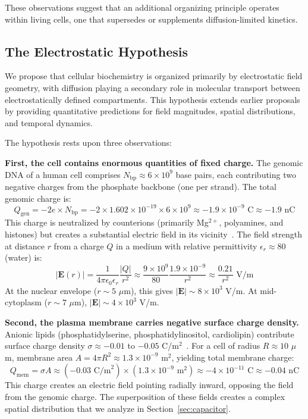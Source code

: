 \documentclass[twocolumn,10pt,aps,prd,superscriptaddress,floatfix,nofootinbib]{revtex4-2}
\theoremstyle{remark}
\begin{document}
These observations suggest that an additional organizing principle operates within living cells, one that supersedes or supplements diffusion-limited kinetics.

\subsection{The Electrostatic Hypothesis}

We propose that cellular biochemistry is organized primarily by electrostatic field geometry, with diffusion playing a secondary role in molecular transport between electrostatically defined compartments. This hypothesis extends earlier proposals~\cite{Pollack2001,Ling2001} by providing quantitative predictions for field magnitudes, spatial distributions, and temporal dynamics.

The hypothesis rests upon three observations:

\textbf{First, the cell contains enormous quantities of fixed charge.} The genomic DNA of a human cell comprises $N_{\mathrm{bp}} \approx 6 \times 10^{9}$ base pairs, each contributing two negative charges from the phosphate backbone (one per strand). The total genomic charge is:
\begin{equation}
Q_{\mathrm{gen}} = -2e \times N_{\mathrm{bp}} = -2 \times 1.602 \times 10^{-19} \times 6 \times 10^{9} \approx -1.9 \times 10^{-9} \text{ C} \approx -1.9 \text{ nC}
\label{eq:genomic_charge}
\end{equation}
This charge is neutralized by counterions (primarily Mg$^{2+}$, polyamines, and histones) but creates a substantial electric field in its vicinity~\cite{Manning1978}. The field strength at distance $r$ from a charge $Q$ in a medium with relative permittivity $\epsilon_r \approx 80$ (water) is:
\begin{equation}
|\mathbf{E}(r)| = \frac{1}{4\pi\epsilon_0\epsilon_r} \frac{|Q|}{r^2} \approx \frac{9 \times 10^{9}}{80} \frac{1.9 \times 10^{-9}}{r^2} \approx \frac{0.21}{r^2} \text{ V/m}
\label{eq:field_from_genome}
\end{equation}
At the nuclear envelope ($r \sim 5$ $\mu$m), this gives $|\mathbf{E}| \sim 8 \times 10^{3}$ V/m. At mid-cytoplasm ($r \sim 7$ $\mu$m), $|\mathbf{E}| \sim 4 \times 10^{3}$ V/m.

\textbf{Second, the plasma membrane carries negative surface charge density.} Anionic lipids (phosphatidylserine, phosphatidylinositol, cardiolipin) contribute surface charge density $\sigma \approx -0.01$ to $-0.05$ C/m$^2$~\cite{McLaughlin1989,Israelachvili2011}. For a cell of radius $R \approx 10$ $\mu$m, membrane area $A = 4\pi R^2 \approx 1.3 \times 10^{-9}$ m$^2$, yielding total membrane charge:
\begin{equation}
Q_{\mathrm{mem}} = \sigma A \approx (-0.03 \text{ C/m}^2) \times (1.3 \times 10^{-9} \text{ m}^2) \approx -4 \times 10^{-11} \text{ C} \approx -0.04 \text{ nC}
\label{eq:membrane_charge}
\end{equation}
This charge creates an electric field pointing radially inward, opposing the field from the genomic charge. The superposition of these fields creates a complex spatial distribution that we analyze in Section~\ref{sec:capacitor}.
\end{document}

